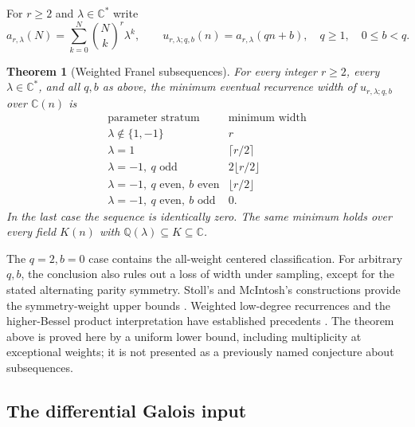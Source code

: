 \documentclass[11pt,a4paper]{article}
\newtheorem{theorem}{Theorem}[section]
\theoremstyle{definition}
\theoremstyle{remark}
\numberwithin{equation}{section}
\begin{document}
For $r\ge2$ and $\lambda\in\mathbb C^*$ write
\[
 a_{r,\lambda}(N)=\sum_{k=0}^N\binom Nk^r\lambda^k,
 \qquad u_{r,\lambda;q,b}(n)=a_{r,\lambda}(qn+b),
 \quad q\ge1,\quad 0\le b<q.
\]

\begin{theorem}[Weighted Franel subsequences]
\label{E:ac:subsequence}
For every integer $r\ge2$, every $\lambda\in\mathbb C^*$, and all
$q,b$ as above, the minimum eventual recurrence width of
$u_{r,\lambda;q,b}$ over $\mathbb C(n)$ is
\[
\begin{array}{c|c}
\text{parameter stratum}&\text{minimum width}\\ \hline
\lambda\notin\{1,-1\}&r\\
\lambda=1&\lceil r/2\rceil\\
\lambda=-1,\ q\text{ odd}&2\lfloor r/2\rfloor\\
\lambda=-1,\ q\text{ even},\ b\text{ even}&\lfloor r/2\rfloor\\
\lambda=-1,\ q\text{ even},\ b\text{ odd}&0.
\end{array}
\]
In the last case the sequence is identically zero. The same minimum
holds over every field $K(n)$ with
$\mathbb Q(\lambda)\subseteq K\subseteq\mathbb C$.
\end{theorem}

The $q=2,b=0$ case contains the all-weight centered classification.
For arbitrary $q,b$, the conclusion also rules out a loss of width
under sampling, except for the stated alternating parity symmetry.
Stoll's and McIntosh's constructions provide the symmetry-weight
upper bounds \cite{AC_Stoll,AC_McIntosh}. Weighted low-degree
recurrences and the higher-Bessel product interpretation have
established precedents \cite{AC_MatalaAho,AC_GRvS}. The theorem
above is proved here by a uniform lower bound, including multiplicity
at exceptional weights; it is not presented as a previously named
conjecture about subsequences.

\subsection{The differential Galois input}
\end{document}

